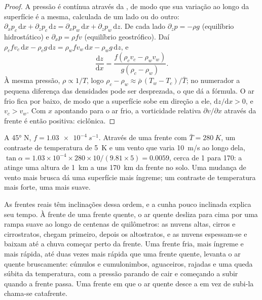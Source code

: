 \begin{proof}
A pressão é contínua através da , de modo que sua variação ao longo da superfície é a
mesma, calculada de um lado ou do outro: $\partial_x p_c\,\mathrm{d}x + \partial_z p_c\,\mathrm{d}z =
\partial_x p_w\,\mathrm{d}x + \partial_z p_w\,\mathrm{d}z$. De cada lado $\partial_z p = -\rho g$
(equilíbrio hidrostático) e $\partial_x p = \rho f v$ (equilíbrio geostrófico). Daí
$\rho_c f v_c\,\mathrm{d}x - \rho_c g\,\mathrm{d}z = \rho_w f v_w\,\mathrm{d}x - \rho_w
g\,\mathrm{d}z$, e
\[
  \frac{\mathrm{d}z}{\mathrm{d}x} = \frac{f(\rho_c v_c - \rho_w v_w)}{g(\rho_c - \rho_w)} .
\]
À mesma pressão, $\rho \propto 1/T$, logo $\rho_c - \rho_w \approx \bar\rho\,(T_w -
T_c)/\bar T$; no numerador a pequena diferença das densidades pode ser desprezada, o que
dá a fórmula. O ar frio fica por baixo, de modo que a superfície sobe em direção a ele, $\mathrm{d}z/
\mathrm{d}x > 0$, e $v_c > v_w$. Com $x$ apontando para o ar frio, a vorticidade relativa
$\partial v/\partial x$ através da frente é então positiva: ciclônica.
\end{proof}

\begin{example}\label{ex:b2:weather-systems:slope}
A \ang{45} N, $f = \qty{1.03e-4}{s^{-1}}$. Através de uma frente com $\bar T = \qty{280}{K}$, um
contraste de temperatura de \qty{5}{K} e um vento que varia \qty{10}{m/s} ao longo dela, $\tan\alpha
= 1.03 \times 10^{-4} \times 280 \times 10/(9.81 \times 5) = 0.0059$, cerca de 1 para 170: a
 atinge uma altura de \qty{1}{km} a uns \qty{170}{km} da frente no solo.
Uma mudança de vento mais brusca dá uma superfície mais íngreme; um contraste de temperatura mais forte, uma mais suave.
\end{example}

As frentes reais têm inclinações dessa ordem, e a cunha pouco inclinada explica seu tempo. À frente de uma
frente quente, o ar quente desliza para cima por uma rampa suave ao longo de centenas de quilômetros: as nuvens altas,
cirros e cirrostratos, chegam primeiro, depois os altostratos, e as nuvens espessam-se e baixam até a
chuva começar perto da frente. Uma frente fria, mais íngreme e mais rápida, até duas vezes mais rápida que uma
frente quente, levanta o ar quente bruscamente: cúmulos e cumulonimbos, aguaceiros, rajadas e uma queda súbita
da temperatura, com a pressão parando de cair e começando a subir quando a frente passa. Uma frente
em que o ar quente desce a  em vez de subi-la chama-se catafrente.

